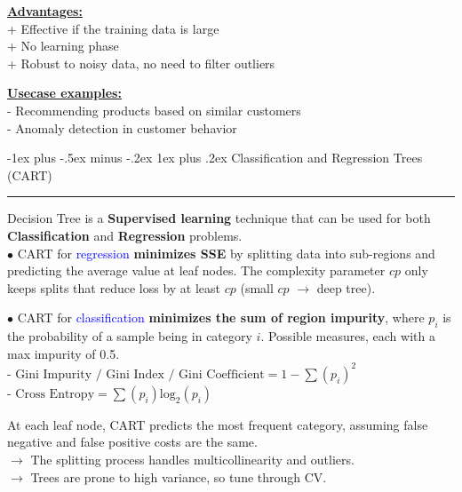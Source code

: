 \documentclass[letterpaper, 10.5pt,landscape]{article}
\makeatletter
\renewcommand{\subsubsection}{\@startsection{subsubsection}{3}{0mm}%
                                {-1ex plus -.5ex minus -.2ex}%
                                {1ex plus .2ex}%
                                {\normalfont\small\bfseries}}
\makeatother
\begin{document}
\begin{multicols*}{3}
 \vspace{3pt}
 \textbf{\underline{Advantages:}} \\
+ Effective if the training data is large \\
+ No learning phase \\
+ Robust to noisy data, no need to filter outliers

 \vspace{3pt}
 \textbf{\underline{Usecase examples:}} \\
- Recommending products based on similar customers \\
- Anomaly detection in customer behavior



\subsubsection{Classification and Regression Trees (CART)} {\color{teal}\hrule height 0.5pt} \smallskip

Decision Tree is a \textbf{Supervised learning} technique that can be used for both \textbf{Classification} and \textbf{Regression} problems. \\

\vspace{3pt}
$\bullet$ CART for \textcolor{blue}{regression } \textbf{minimizes SSE} by splitting data into sub-regions and predicting the average value at leaf nodes. The complexity parameter $cp$ only keeps splits that reduce loss by at least $cp$ (small $cp$ $\rightarrow$ deep tree). 

\vspace{2pt}
$\bullet$ CART for \textcolor{blue}{classification }
\textbf{minimizes the sum of region impurity}, where $p_{i}$ is the probability of a sample being in category $i$. Possible measures, each with a max impurity of 0.5.
\\

- \( \boxed{\text{Gini Impurity / Gini Index / Gini Coefficient} = 1 - \sum(p_{i})^{2}} \) \\
- \(\boxed{
\text{Cross Entropy} = \sum(p_{i})\text{log}_{2}(p_{i})} \)

\vspace{2pt}
At each leaf node, CART predicts the most frequent category, assuming false negative and false positive costs are the same. \\

$\rightarrow$ The splitting process handles multicollinearity and outliers. \\
$\rightarrow$ Trees are prone to high variance, so tune through CV.


\end{multicols*}
\end{document}
